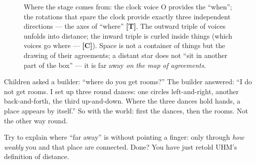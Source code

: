 \documentclass[11pt,letterpaper]{article}
\newcommand{\stT}{\textbf{[T]}\xspace}
\newcommand{\stC}{\textbf{[C]}\xspace}
\begin{document}
\begin{figure}[H]
\centering
{}
\caption{Where the stage comes from: the clock voice O provides the
``when''; the rotations that spare the clock provide exactly three
independent directions --- the axes of ``where'' \stT. The outward
triple of voices unfolds into distance; the inward triple is curled
inside things (which voices go where --- \stC). Space is not a
container of things but the drawing of their agreements; a distant
star does not ``sit in another part of the box'' --- it is far away
\emph{on the map of agreements}.}
\label{fig:stage}
\end{figure}

\begin{talebox}
Children asked a builder: ``where do you get rooms?'' The builder
answered: ``I do not get rooms. I set up three round dances: one
circles left-and-right, another back-and-forth, the third
up-and-down. Where the three dances hold hands, a place appears by
itself.'' So with the world: first the dances, then the rooms. Not
the other way round.
\end{talebox}

\begin{askbox}
Try to explain where ``far away'' is without pointing a finger:
only through \emph{how weakly} you and that place are connected.
Done? You have just retold UHM's definition of distance.
\end{askbox}
\end{document}
